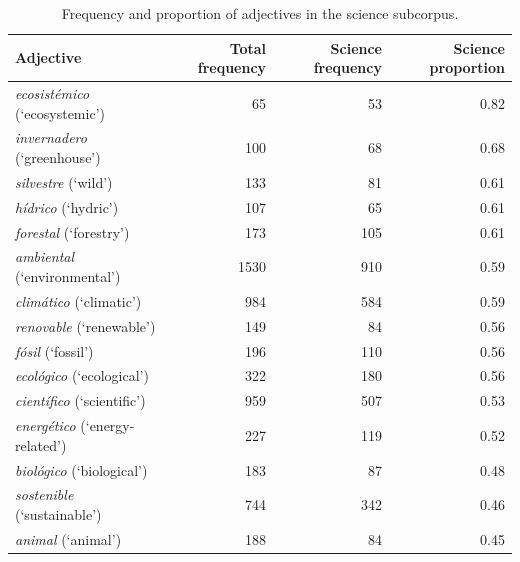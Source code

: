 \documentclass[11pt,a4paper]{article}
\begin{document}
\begin{table}[H]
	\centering
	\caption{Frequency and proportion of adjectives in the science subcorpus.}
	\begin{tabular}{lrrr}
		\toprule
		\textbf{Adjective} & \textbf{Total frequency} & \textbf{Science frequency} & \textbf{Science proportion} \\
		\midrule
		\textit{ecosistémico} (`ecosystemic')   & 65   & 53  & 0.82 \\
		\textit{invernadero} (`greenhouse')     & 100  & 68  & 0.68 \\
		\textit{silvestre} (`wild')             & 133  & 81  & 0.61 \\
		\textit{hídrico} (`hydric')             & 107  & 65  & 0.61 \\
		\textit{forestal} (`forestry')          & 173  & 105 & 0.61 \\
		\textit{ambiental} (`environmental')    & 1530 & 910 & 0.59 \\
		\textit{climático} (`climatic')         & 984  & 584 & 0.59 \\
		\textit{renovable} (`renewable')        & 149  & 84  & 0.56 \\
		\textit{fósil} (`fossil')               & 196  & 110 & 0.56 \\
		\textit{ecológico} (`ecological')       & 322  & 180 & 0.56 \\
		\textit{científico} (`scientific')      & 959  & 507 & 0.53 \\
		\textit{energético} (`energy-related')  & 227  & 119 & 0.52 \\
		\textit{biológico} (`biological')       & 183  & 87  & 0.48 \\
		\textit{sostenible} (`sustainable')     & 744  & 342 & 0.46 \\
		\textit{animal} (`animal')              & 188  & 84  & 0.45 \\
		\bottomrule
	\end{tabular}
	
	\label{tab:adjetivos_ciencia}
\end{table}
\end{document}
